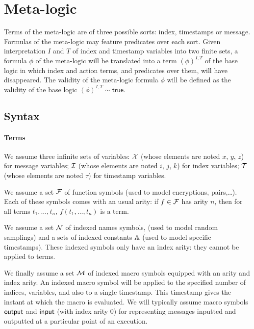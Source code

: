 \section{Meta-logic}

Terms of the meta-logic are of three possible sorts: index, timestamps
or message. Formulas of the meta-logic may feature predicates over each sort.
Given interpretation $I$ and $T$ of index and timestamp variables
into two finite sets, a formula $\phi$ of the meta-logic will be translated
into a term $(\phi)^{I,T}$ of the base logic in which index and action terms,
and predicates over them, will have disappeared. The validity of the
meta-logic formula $\phi$ will be defined as the validity of the base logic
$(\phi)^{I,T}\sim\mathsf{true}$.

\subsection{Syntax}

\paragraph{Terms}

We assume three infinite sets of variables:
$\mathcal{X}$ (whose elements are noted $x$, $y$, $z$) for message variables;
$\mathcal{I}$ (whose elements are noted $i$, $j$, $k$) for index variables;
$\mathcal{T}$ (whose elements are noted $\tau$) for timestamp variables.

We assume a set $\mathcal{F}$ of function symbols
(used to model encryptions, pairs,\dots).
Each of these symbols comes with an usual arity:
if $f\in\mathcal{F}$ has arity $n$,
then for all terms $t_1,\ldots,t_n$,
$f(t_1,\ldots,t_n)$ is a term.

We assume a set $\mathcal{N}$ of indexed names symbols,
(used to model random samplings)
and a sets of indexed constants $\mathbb{A}$
(used to model specific timestamps).
These indexed symbols only have an index arity: they
cannot be applied to terms.

We finally assume a set $\mathcal{M}$ of indexed macro symbols
equipped with an arity and index arity.
An indexed macro symbol will be applied to the specified number of
indices, variables, and also to a single timestamp.
This timestamp gives the instant at which the macro is evaluated.
We will typically assume macro symbols $\textsf{output}$ and $\textsf{input}$
(with index arity $0$) for representing messages inputted and outputted
at a particular point of an execution.


